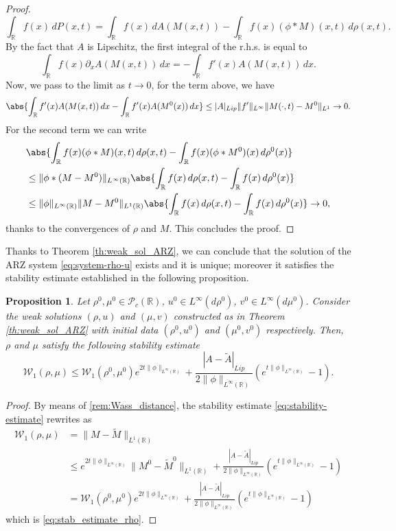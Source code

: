 \documentclass[11pt,a4paper,oneside]{amsart}
\newtheorem{prop}[definition]{Proposition}
\newcommand\R{\mathbb{R}}
\newcommand{\PP}{\mathcal{P}}
\newcommand{\WW}{\mathcal{W}}
\begin{document}
\begin{proof}
    $$
    \int_\R f(x)\,dP(x,t)=\int_\R f(x)\,dA(M(x,t))-\int_\R f(x)(\phi\ast M)(x,t)\,d\rho(x,t).
    $$
    By the fact that $A$ is Lipschitz, the first integral of the r.h.s. is equal to
    $$
    \int_\R f(x) \partial_x A(M(x,t))\,dx=-\int_\R f'(x)A(M(x,t))\,dx.
    $$
    Now, we pass to the limit as $t\to0$, for the term above, we have
    $$
    \abs{\int_\R f'(x)A(M(x,t))\,dx-\int_\R f'(x)A(M^0(x))\,dx}\leq |A|_{Lip}\|f'\|_{L^\infty}\|M(\cdot,t)-M^0\|_{L^1}\to0.
    $$
    For the second term we can write
    \begin{align*}
        &\abs{\int_\R f(x)(\phi\ast M)(x,t)\,d\rho(x,t)-\int_\R f(x)(\phi\ast M^0)(x)\,d\rho^0(x)}\\
        &\leq \|\phi\ast(M-M^0)\|_{L^\infty(\R)}\abs{\int_\R f(x)\,d\rho(x,t)-\int_\R f(x)\,d\rho^0(x)}\\
        &\leq \|\phi\|_{L^\infty(\R)}\|M-M^0\|_{L^1(\R)}\abs{\int_\R f(x)\,d\rho(x,t)-\int_\R f(x)\,d\rho^0(x)}\to 0,
    \end{align*}
    thanks to the convergences of $\rho$ and $M$.
    This concludes the proof.
\end{proof}
Thanks to Theorem \ref{th:weak_sol_ARZ}, we can conclude that the solution of the ARZ system \eqref{eq:system-rho-u} 
exists and it is unique; moreover it satisfies the stability estimate established in the following proposition.
\begin{prop}
    Let $\rho^0,\mu^0\in\PP_c(\R)$, $u^0\in L^\infty(d\rho^0)$, $v^0\in L^\infty(d\mu^0)$. Consider the weak solutions $(\rho,u)$ and $(\mu,v)$ 
    constructed as in Theorem \ref{th:weak_sol_ARZ} with initial data $(\rho^0,u^0)$ and $(\mu^0,v^0)$ respectively. 
    Then, $\rho$ and $\mu$ satisfy the following stability estimate
    \begin{equation}\label{eq:stab_estimate_rho}
        \WW_1(\rho,\mu)\leq \WW_1(\rho^0,\mu^0)e^{2t\|\phi\|_{L^\infty(\R)}}+\frac{|A-\tilde A|_{Lip}}{2\|\phi\|_{L^\infty(\R)}}(e^{t\|\phi\|_{L^\infty(\R)}}-1).
    \end{equation}
\end{prop}
\begin{proof} {\color{black} By means of  \eqref{rem:Wass_distance}, %
the stability estimate \eqref{eq:stability-estimate} rewrites as} %
    \begin{align*}
    \WW_1(\rho,\mu)&=\|M-\tilde M\|_{L^1(\R)}\\
    &\leq e^{2t\|\phi\|_{L^\infty(\R)}}\|M^0-\tilde M^0\|_{L^1(\R)}+\frac{|A-\tilde A|_{Lip}}{2\|\phi\|_{L^\infty(\R)}}(e^{t\|\phi\|_{L^\infty(\R)}}-1)\\
   & =\WW_1(\rho^0,\mu^0)e^{2t\|\phi\|_{L^\infty(\R)}} + \frac{|A-\tilde A|_{Lip}}{2\|\phi\|_{L^\infty(\R)}}(e^{t\|\phi\|_{L^\infty(\R)}}-1)
    \end{align*}
     {\color{black} which is \eqref{eq:stab_estimate_rho}.}
\end{proof}
\end{document}
